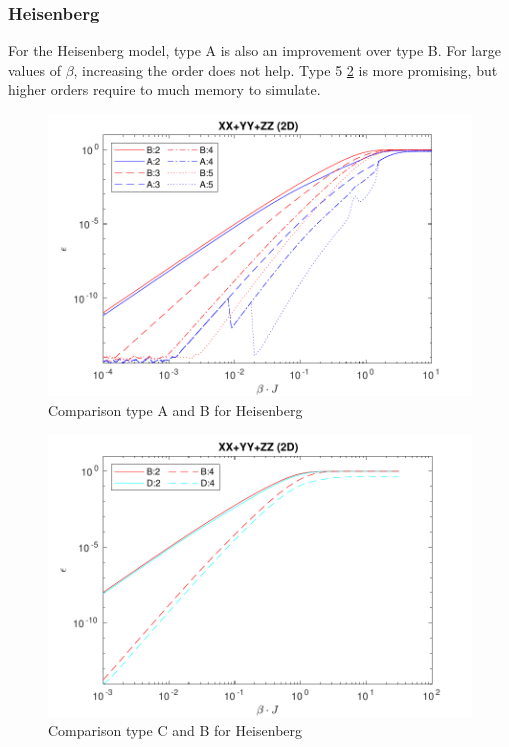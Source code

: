 \subsubsection{Heisenberg}

For the Heisenberg model, type A is also an improvement over type B. For large values of $\beta$, increasing the order does not help. Type 5 \cref{bench:type5heis} is more promising, but higher orders require to much memory to simulate.


\begin{figure}[H]
    \center
    \includegraphics[width=\textwidth]{Figuren/benchmarking/heis_XXX.pdf}
    \caption{Comparison type A and B for Heisenberg}
    \label{fig:benchmark:Heisenberg}
\end{figure}


\begin{figure}[H]
    \center
    \includegraphics[width=\textwidth]{Figuren/benchmarking/type5/heis.pdf}
    \caption{Comparison type C and B for Heisenberg}
    \label{bench:type5heis}
\end{figure}




